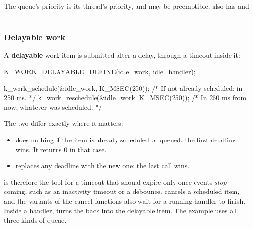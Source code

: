 \noindent The queue’s priority is its thread’s priority, and may be preemptible.  also has  and .

\subsubsection{Delayable work}
A \textbf{delayable} work item is submitted after a delay, through a timeout inside it:

\begin{ccode}
K_WORK_DELAYABLE_DEFINE(idle_work, idle_handler);

k_work_schedule(&idle_work, K_MSEC(250));     /* If not already scheduled: in 250 ms. */
k_work_reschedule(&idle_work, K_MSEC(250));   /* In 250 ms from now, whatever was scheduled. */
\end{ccode}

\noindent The two differ exactly where it matters:

\begin{itemize}
  \item \textbf{} does nothing if the item is already scheduled or queued: the first
    deadline wins. It returns 0 in that case.
  \item \textbf{} replaces any deadline with the new one: the last call wins.
\end{itemize}

 is therefore the tool for a timeout that should expire only once events
\emph{stop} coming, such as an inactivity timeout or a debounce. 
cancels a scheduled item, and the  variants of the cancel functions also wait for a
running handler to finish. Inside a handler,  turns the
 back into the delayable item. The  example uses all three
kinds of queue.

